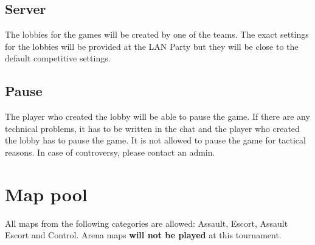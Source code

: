 \documentclass{article}
\begin{document}
\subsection{Server}
The lobbies for the games will be created by one of the teams. The exact settings for the lobbies will be provided at the LAN Party but they will be close to the default competitive settings.

\subsection{Pause}
The player who created the lobby will be able to pause the game. If there are any technical problems, it has to be written in the chat and the player who created the lobby has to pause the game. It is not allowed to pause the game for tactical reasons. In case of controversy, please contact an admin.

\section{Map pool}
All maps from the following categories are allowed: Assault, Escort, Assault Escort and Control.
Arena maps \textbf{will not be played} at this tournament.
\end{document}
